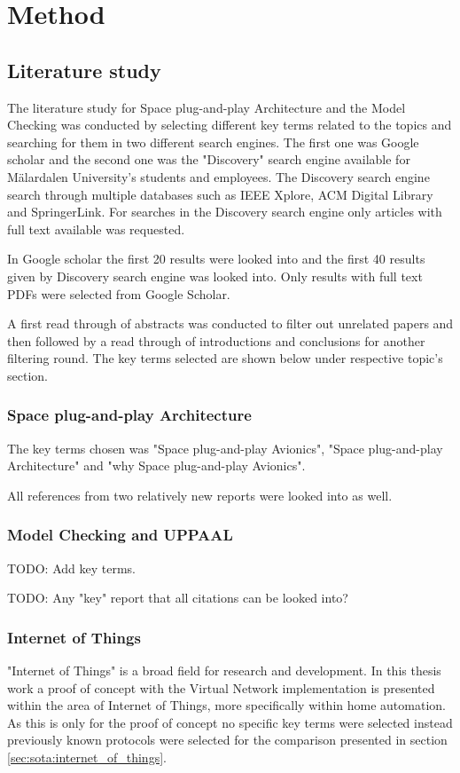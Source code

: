 \chapter{Method}\label{ch:method}
\section{Literature study}
The literature study for Space plug-and-play Architecture and the Model
Checking was conducted by selecting different key terms related to the topics
and searching for them in two different search engines. The first one was
Google scholar and the second one was the "Discovery" search engine available
for Mälardalen University's students and employees. The Discovery search engine
search through multiple databases such as IEEE Xplore, ACM Digital Library and
SpringerLink. For searches in the Discovery search engine only articles with
full text available was requested.

In Google scholar the first 20 results were looked into and the first 40
results given by Discovery search engine was looked into. Only results with
full text PDFs were selected from Google Scholar.

A first read through of abstracts was conducted to filter out unrelated
papers and then followed by a read through of introductions and conclusions for
another filtering round. The key terms selected are shown below under
respective topic's section.

\subsection{Space plug-and-play Architecture}
The key terms chosen was "Space plug-and-play Avionics", "Space
plug-and-play Architecture" and "why Space plug-and-play Avionics".

All references from two relatively new reports were looked into as well.


\subsection{Model Checking and UPPAAL}
TODO: Add key terms.

TODO: Any "key" report that all citations can be looked into?

\subsection{Internet of Things}
"Internet of Things" is a broad field for research and development. In
this thesis work a proof of concept with the Virtual Network implementation is
presented within the area of Internet of Things, more specifically within home
automation. As this is only for the proof of concept no specific key terms were
selected instead previously known protocols were selected for the comparison
presented in section \ref{sec:sota:internet_of_things}.

